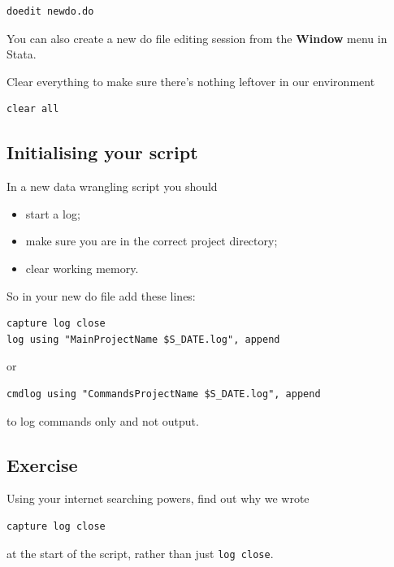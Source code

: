 \documentclass[
]{article}
\providecommand{\tightlist}{%
  \setlength{\itemsep}{0pt}\setlength{\parskip}{0pt}}
\begin{document}
\begin{verbatim}
doedit newdo.do
\end{verbatim}

You can also create a new do file editing session from the \textbf{Window} menu in Stata.

Clear everything to make sure there's nothing leftover in our environment

\begin{verbatim}
clear all
\end{verbatim}

\hypertarget{initialising-your-script}{%
\subsection{Initialising your script}\label{initialising-your-script}}

In a new data wrangling script you should

\begin{itemize}
\tightlist
\item
  start a log;
\item
  make sure you are in the correct project directory;
\item
  clear working memory.
\end{itemize}

So in your new do file add these lines:

\begin{verbatim}
capture log close
log using "MainProjectName $S_DATE.log", append
\end{verbatim}

or

\begin{verbatim}
cmdlog using "CommandsProjectName $S_DATE.log", append
\end{verbatim}

to log commands only and not output.

\hypertarget{exercise-1}{%
\subsection{Exercise}\label{exercise-1}}

Using your internet searching powers, find out why we wrote

\begin{verbatim}
capture log close
\end{verbatim}

at the start of the script, rather than just \texttt{log\ close}.
\end{document}
